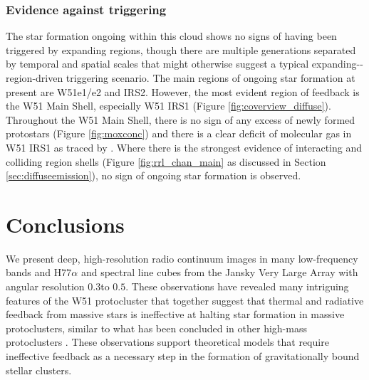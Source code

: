 \subsubsection{Evidence against triggering}
The star formation ongoing within this cloud shows no signs of having been
triggered by expanding \hii regions, though there are multiple generations
separated by temporal and spatial scales that might otherwise suggest a typical
expanding-\hii-region-driven triggering
scenario.  The main regions of ongoing star formation at present are W51e1/e2
and IRS2.  However, the most evident region of feedback is the W51 Main Shell,
especially W51 IRS1 
(Figure \ref{fig:coverview_diffuse}).  Throughout the W51 Main Shell, there is no sign
of any excess of newly formed protostars (Figure \ref{fig:moxconc}) and there
is a clear deficit of molecular gas in W51 IRS1 as traced by \ceighteeno \citep[Figure
\ref{fig:contonco};][]{Parsons2012a}.  Where there is the
strongest evidence of interacting and colliding \hii region shells (Figure
\ref{fig:rrl_chan_main} as discussed in Section \ref{sec:diffuseemission}),
no sign of ongoing star formation is observed.


\section{Conclusions}
\label{sec:conclusion}
We present deep, high-resolution radio continuum images in many low-frequency
bands and H$77\alpha$ and \ortho \twotwo spectral line cubes  from the Jansky
Very Large Array with angular resolution $0.3$\arcsec to $0.5$\arcsec.   These
observations have revealed many intriguing features of the W51 protocluster
that together suggest that thermal and radiative feedback from massive stars is
ineffective at halting star formation in massive protoclusters, similar to what
has been concluded in other high-mass protoclusters \citep[e.g.]{Ginsburg2012a,
Galvan-Madrid2013a}.
These observations support theoretical models that require ineffective feedback
as a necessary step in the formation of gravitationally bound stellar clusters.

